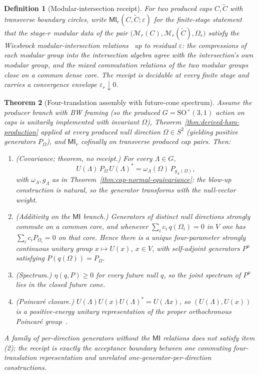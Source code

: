 \documentclass[11pt]{article}
\newtheorem{theorem}{Theorem}[section]
\newtheorem{definition}[theorem]{Definition}
\begin{document}
\begin{definition}[Modular-intersection receipt]
\label{def:modular-intersection-receipt}
For two produced caps \(C,\tilde C\) with transverse boundary circles, write
\(\mathsf{MI}_r(C,\tilde C;\varepsilon)\) for the finite-stage statement that
the stage-\(r\) modular data of the pair
\(\bigl(\mathcal M_r(C),\mathcal M_r(\tilde C),\Omega_r\bigr)\) satisfy the
Wiesbrock modular-intersection relations~\cite{wiesbrock98} up to residual
\(\varepsilon\): the compressions of each modular group into the intersection
algebra agree with the intersection's own modular group, and the mixed
commutation relations of the two modular groups close on a common dense core.
The receipt is decidable at every finite stage and carries a convergence
envelope \(\varepsilon_r\downarrow0\).
\end{definition}

\begin{theorem}[Four-translation assembly with future-cone spectrum]
\label{thm:four-translation-assembly}
Assume the producer branch with BW framing (so the produced
\(G=\mathrm{SO}^{+}(3,1)\) action on caps is unitarily implemented with
invariant \(\Omega\)), Theorem~\ref{thm:derived-hsm-production} applied at
every produced null direction \(\Omega\in S^2\) (yielding positive generators
\(P_{\Omega}\)), and \(\mathsf{MI}_r\) cofinally on transverse produced cap
pairs. Then:
\begin{enumerate}[leftmargin=2em]
\item (\emph{Covariance; theorem, no receipt.}) For every \(\Lambda\in G\),
\[
U(\Lambda)\,P_{\Omega}\,U(\Lambda)^{*}
=\omega_{\Lambda}(\Omega)\,P_{g_{\Lambda}(\Omega)},
\]
with \(\omega_\Lambda,g_\Lambda\) as in
Theorem~\ref{thm:cap-normal-equivariance}: the blow-up construction is
natural, so the generator transforms with the null-vector weight.
\item (\emph{Additivity on the \(\mathsf{MI}\) branch.}) Generators of
distinct null directions strongly commute on a common core, and whenever
\(\sum_i c_i\,q(\Omega_i)=0\) in \(V\) one has
\(\sum_i c_iP_{\Omega_i}=0\) on that core. Hence there is a unique
four-parameter strongly continuous unitary group \(x\mapsto U(x)\),
\(x\in V\), with self-adjoint generators \(P^{\mu}\) satisfying
\(P(q(\Omega))=P_{\Omega}\).
\item (\emph{Spectrum.}) \(\eta(q,P)\ge0\) for every future null \(q\), so the
joint spectrum of \(P^\mu\) lies in the closed future cone.
\item (\emph{Poincar\'e closure.}) \(U(\Lambda)U(x)U(\Lambda)^{*}=U(\Lambda x)\),
so \((U(\Lambda),U(x))\) is a positive-energy unitary representation of the
proper orthochronous Poincar\'e group~\cite{bgl93}.
\end{enumerate}
A family of per-direction generators without the \(\mathsf{MI}\) relations
does not satisfy item (2); the receipt is exactly the acceptance boundary
between one commuting four-translation representation and unrelated
one-generator-per-direction constructions.
\end{theorem}
\end{document}
